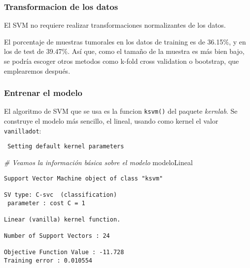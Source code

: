 \documentclass[
]{article}
\newenvironment{Shaded}{\begin{snugshade}}{\end{snugshade}}
\newcommand{\CommentTok}[1]{\textcolor[rgb]{0.56,0.35,0.01}{\textit{#1}}}
\newcommand{\DataTypeTok}[1]{\textcolor[rgb]{0.13,0.29,0.53}{#1}}
\newcommand{\KeywordTok}[1]{\textcolor[rgb]{0.13,0.29,0.53}{\textbf{#1}}}
\newcommand{\NormalTok}[1]{#1}
\newcommand{\OperatorTok}[1]{\textcolor[rgb]{0.81,0.36,0.00}{\textbf{#1}}}
\newcommand{\StringTok}[1]{\textcolor[rgb]{0.31,0.60,0.02}{#1}}
\begin{document}
\hypertarget{transformacion-de-los-datos-1}{%
\subsubsection{Transformacion de los
datos}\label{transformacion-de-los-datos-1}}

El SVM no requiere realizar transformaciones normalizantes de los datos.

El porcentaje de muestras tumorales en los datos de training es de
36.15\%, y en los de test de 39.47\%. Así que, como el tamaño de la
muestra es más bien bajo, se podría escoger otros metodos como k-fold
cross validation o bootstrap, que emplearemos después.

\hypertarget{entrenar-el-modelo-3}{%
\subsubsection{Entrenar el modelo}\label{entrenar-el-modelo-3}}

El algoritmo de SVM que se usa es la funcion \texttt{ksvm()} del paquete
\emph{kernlab}. Se construye el modelo más sencillo, el lineal, usando
como kernel el valor \texttt{vanilladot}:

\begin{Shaded}
\end{Shaded}

\begin{verbatim}
 Setting default kernel parameters  
\end{verbatim}

\begin{Shaded}
\begin{Highlighting}[]
\CommentTok{# Veamos la información básica sobre el modelo}
\NormalTok{modeloLineal}
\end{Highlighting}
\end{Shaded}

\begin{verbatim}
Support Vector Machine object of class "ksvm" 

SV type: C-svc  (classification) 
 parameter : cost C = 1 

Linear (vanilla) kernel function. 

Number of Support Vectors : 24 

Objective Function Value : -11.728 
Training error : 0.010554 
\end{verbatim}
\end{document}
